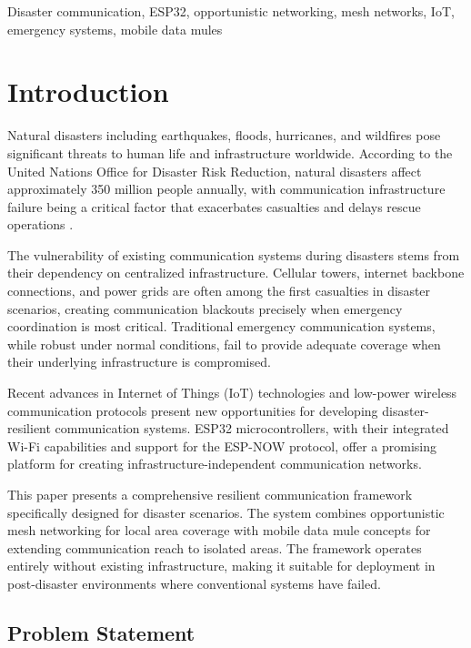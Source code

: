 \documentclass[conference]{IEEEtran}
\begin{document}
\begin{IEEEkeywords}
Disaster communication, ESP32, opportunistic networking, mesh networks, IoT, emergency systems, mobile data mules
\end{IEEEkeywords}

\section{Introduction}

Natural disasters including earthquakes, floods, hurricanes, and wildfires pose significant threats to human life and infrastructure worldwide. According to the United Nations Office for Disaster Risk Reduction, natural disasters affect approximately 350 million people annually, with communication infrastructure failure being a critical factor that exacerbates casualties and delays rescue operations \cite{Hassan2017}.

The vulnerability of existing communication systems during disasters stems from their dependency on centralized infrastructure. Cellular towers, internet backbone connections, and power grids are often among the first casualties in disaster scenarios, creating communication blackouts precisely when emergency coordination is most critical. Traditional emergency communication systems, while robust under normal conditions, fail to provide adequate coverage when their underlying infrastructure is compromised.

Recent advances in Internet of Things (IoT) technologies and low-power wireless communication protocols present new opportunities for developing disaster-resilient communication systems. ESP32 microcontrollers, with their integrated Wi-Fi capabilities and support for the ESP-NOW protocol, offer a promising platform for creating infrastructure-independent communication networks.

This paper presents a comprehensive resilient communication framework specifically designed for disaster scenarios. The system combines opportunistic mesh networking for local area coverage with mobile data mule concepts for extending communication reach to isolated areas. The framework operates entirely without existing infrastructure, making it suitable for deployment in post-disaster environments where conventional systems have failed.

\subsection{Problem Statement}
\end{document}
